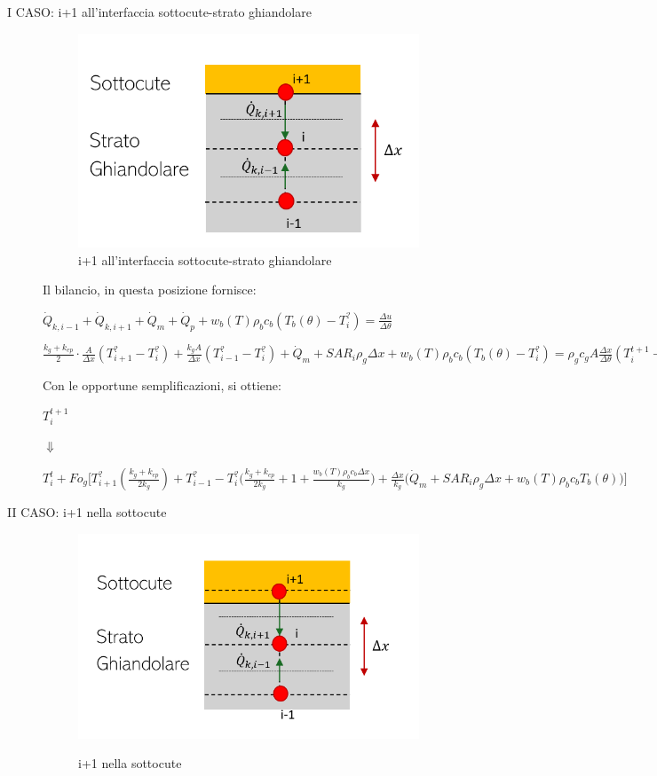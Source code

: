 \begin{description}
    \item[I CASO: i+1 all'interfaccia sottocute-strato ghiandolare]
    \begin{figure}[H]
    \centering
    \includegraphics[width=.6\textwidth]{Immagini/Nodi/nodo8.1.png} 
    \caption{i+1 all'interfaccia sottocute-strato ghiandolare}
    \label{nodo8.1}
\end{figure}
\noindent
\newpage
Il bilancio, in questa posizione fornisce:
\begin{center}
	$ \Dot{Q} _{k, i-1} +\Dot{Q} _{k, i+1}+ \Dot{Q} _{m} +\Dot{Q} _{p}+ w_b (T) \rho _b c_b (T_b(\theta)-T_i ^?)= \frac{\Delta u}{\Delta \theta} $
\end{center}
\vspace{0.15cm}
\begin{center}
	$ \frac{k_g+ k_{ep}}{2} \cdot\frac{ A }{\Delta x}(T_{i+1} ^? - T_i ^? ) + \frac{k_g A }{\Delta x}(T_{i-1} ^? - T_i ^? )+ \Dot{Q} _{m} + SAR_i\rho _g \Delta x + w_b (T) \rho _b c_b (T_b(\theta)-T_i ^?) = \rho _{g} c_{g} A \frac{\Delta x}{ \Delta \theta}(T_i ^{t+1} - T_i ^t ) $
\end{center}
Con le opportune semplificazioni, si ottiene:
\begin{center}
	$T_i ^{t+1} $
\end{center}
\begin{center}
	$\Downarrow$
\end{center}
\begin{center}
	$T_i ^t + Fo_{g} \Bigg[ T_{i+1} ^? (\frac{k_g+ k_{ep}}{2 k_g}) + T_{i-1} ^?- T_i ^? \Big(\frac{k_g+ k_{ep}}{2 k_g} + 1 + \frac{ w_b (T) \rho _b c_b \Delta x }{k_{g}} \Big) + \frac{\Delta x }{k_{g}} \Big(\Dot{Q} _{m} +  SAR_i \rho _{g} \Delta x + w_b (T) \rho _b c_b T_b(\theta)\Big) \Bigg]$
\end{center}


\item[II CASO: i+1 nella sottocute]

     \begin{figure}[H]
    \centering
    \includegraphics[width=.6\textwidth]{Immagini/Nodi/nodo8.2.png} 
    \label{nodo8.2}
    \caption{i+1 nella sottocute}
\end{figure}
\end{description}
